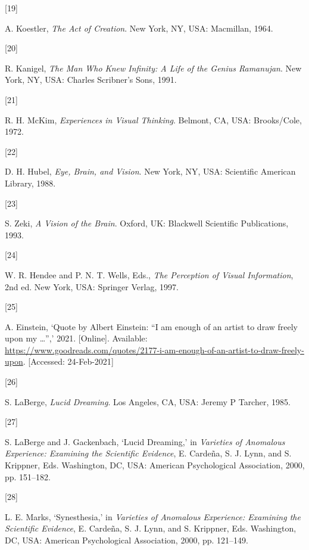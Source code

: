 \documentclass[
  12pt,
  british,
  a4paper,
]{article}
\newlength{\cslhangindent}
\newlength{\csllabelwidth}
\newenvironment{CSLReferences}[2] %
 {%
  \setlength{\parindent}{0pt}
  \ifodd #1 \everypar{\setlength{\hangindent}{\cslhangindent}}\ignorespaces\fi
  \ifnum #2 > 0
  \setlength{\parskip}{#2\baselineskip}
  \fi
 }%
 {}
\newcommand{\CSLLeftMargin}[1]{\parbox[t]{\csllabelwidth}{#1}}
\newcommand{\CSLRightInline}[1]{\parbox[t]{\linewidth - \csllabelwidth}{#1}\break}
\begin{document}
\begin{CSLReferences}{0}{0}
\leavevmode{}%
\CSLLeftMargin{{[}19{]} }
\CSLRightInline{A. Koestler, \emph{{The Act of Creation}}. New York, NY,
USA: Macmillan, 1964. }

\leavevmode{}%
\CSLLeftMargin{{[}20{]} }
\CSLRightInline{R. Kanigel, \emph{{The Man Who Knew Infinity: A Life of
the Genius Ramanujan}}. New York, NY, USA: Charles Scribner's Sons,
1991. }

\leavevmode{}%
\CSLLeftMargin{{[}21{]} }
\CSLRightInline{R. H. McKim, \emph{{Experiences in Visual Thinking}}.
Belmont, CA, USA: Brooks/Cole, 1972. }

\leavevmode{}%
\CSLLeftMargin{{[}22{]} }
\CSLRightInline{D. H. Hubel, \emph{{Eye, Brain, and Vision}}. New York,
NY, USA: Scientific American Library, 1988. }

\leavevmode{}%
\CSLLeftMargin{{[}23{]} }
\CSLRightInline{S. Zeki, \emph{{A Vision of the Brain}}. Oxford, UK:
Blackwell Scientific Publications, 1993. }

\leavevmode{}%
\CSLLeftMargin{{[}24{]} }
\CSLRightInline{W. R. Hendee and P. N. T. Wells, Eds., \emph{{The
Perception of Visual Information}}, 2nd ed. New York, USA: Springer
Verlag, 1997. }

\leavevmode{}%
\CSLLeftMargin{{[}25{]} }
\CSLRightInline{A. Einstein, {`{Quote by Albert Einstein: {``I am enough
of an artist to draw freely upon my \ldots{}''}},'} 2021. {[}Online{]}.
Available:
\url{https://www.goodreads.com/quotes/2177-i-am-enough-of-an-artist-to-draw-freely-upon}.
{[}Accessed: 24-Feb-2021{]}}

\leavevmode{}%
\CSLLeftMargin{{[}26{]} }
\CSLRightInline{S. LaBerge, \emph{{Lucid Dreaming}}. Los Angeles, CA,
USA: Jeremy P Tarcher, 1985. }

\leavevmode{}%
\CSLLeftMargin{{[}27{]} }
\CSLRightInline{S. LaBerge and J. Gackenbach, {`{Lucid Dreaming},'} in
\emph{{Varieties of Anomalous Experience: Examining the Scientific
Evidence}}, E. Cardeña, S. J. Lynn, and S. Krippner, Eds. Washington,
DC, USA: American Psychological Association, 2000, pp. 151--182. }

\leavevmode{}%
\CSLLeftMargin{{[}28{]} }
\CSLRightInline{L. E. Marks, {`Synesthesia,'} in \emph{{Varieties of
Anomalous Experience: Examining the Scientific Evidence}}, E. Cardeña,
S. J. Lynn, and S. Krippner, Eds. Washington, DC, USA: American
Psychological Association, 2000, pp. 121--149. }


\end{CSLReferences}
\end{document}
